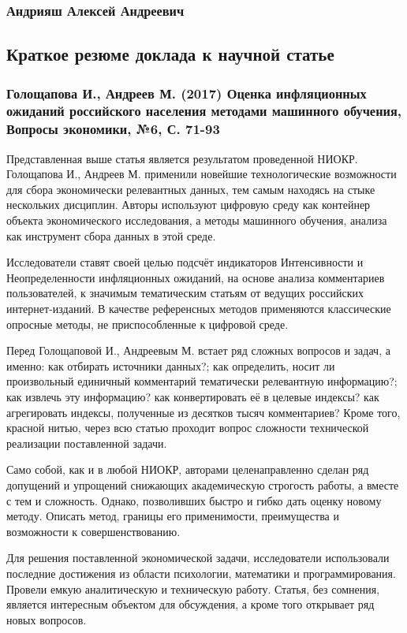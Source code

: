 \documentclass[a4paper, 12pt]{extarticle}
\numberwithin{figure}{section}
\begin{document}
\subsubsection*{Андрияш Алексей Андреевич}
\subsection*{Краткое резюме доклада к научной статье}
\subsubsection*{Голощапова И., Андреев М. (2017) Оценка инфляционных ожиданий российского населения методами машинного обучения, Вопросы экономики, №6, С. 71-93}

Представленная выше статья является результатом проведенной НИОКР. Голощапова И., Андреев М. применили новейшие технологические возможности для сбора экономически релевантных данных, тем самым находясь на стыке нескольких дисциплин. Авторы используют цифровую среду как контейнер объекта экономического исследования, а методы машинного обучения, анализа как инструмент сбора данных в этой среде.

Исследователи ставят своей целью подсчёт индикаторов Интенсивности и Неопределенности инфляционных ожиданий, на основе анализа комментариев пользователей, к значимым тематическим статьям от ведущих российских интернет-изданий. В качестве референсных методов применяются классические опросные методы, не приспособленные к цифровой среде.

Перед Голощаповой И., Андреевым М. встает ряд сложных вопросов и задач, а именно: как отбирать источники данных?; как определить, носит ли произвольный единичный комментарий тематически релевантную информацию?; как извлечь эту информацию? как конвертировать её в целевые индексы? как агрегировать индексы, полученные из десятков тысяч комментариев? Кроме того, красной нитью, через всю статью проходит вопрос сложности технической реализации поставленной задачи. 

Само собой, как и в любой НИОКР, авторами целенаправленно сделан ряд допущений и упрощений снижающих академическую строгость работы, а вместе с тем и сложность. Однако, позволивших быстро и гибко дать оценку новому методу. Описать метод, границы его применимости, преимущества и возможности к совершенствованию. 

Для решения поставленной экономической задачи, исследователи использовали последние достижения из области психологии, математики и программирования. Провели емкую аналитическую и техническую работу. Статья, без сомнения, является интересным объектом для обсуждения, а кроме того открывает ряд новых вопросов.
\end{document}
